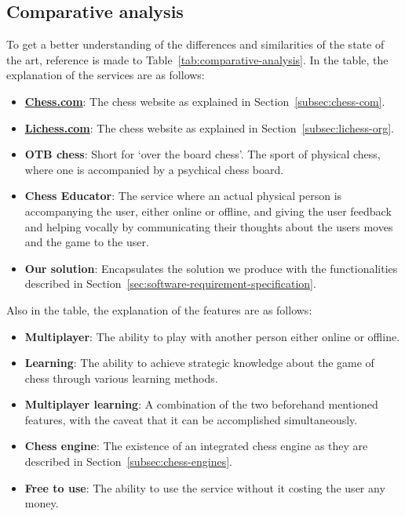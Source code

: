 \subsection{Comparative analysis}\label{subsec:comparative-analysis}

To get a better understanding of the differences and similarities of the state of the art, reference is made to
Table~\ref{tab:comparative-analysis}.
In the table, the explanation of the services are as follows:

\begin{itemize}
    \item \textbf{\url{Chess.com}}: The chess website as explained in Section~\ref{subsec:chess-com}.
    \item \textbf{\url{Lichess.com}}: The chess website as explained in Section~\ref{subsec:lichess-org}.
    \item \textbf{OTB chess}: Short for `over the board chess'.
    The sport of physical chess, where one is accompanied by a psychical chess board.
    \item \textbf{Chess Educator}: The service where an actual physical person is accompanying the user, either online
    or offline, and giving the user feedback and helping vocally by communicating their thoughts about the users moves
    and the game to the user.
    \item \textbf{Our solution}: Encapsulates the solution we produce with the functionalities described in
    Section~\ref{sec:software-requirement-specification}.
\end{itemize}

Also in the table, the explanation of the features are as follows:

\begin{itemize}
    \item \textbf{Multiplayer}: The ability to play with another person either online or offline.
    \item \textbf{Learning}: The ability to achieve strategic knowledge about the game of chess through various learning
    methods.
    \item \textbf{Multiplayer learning}: A combination of the two beforehand mentioned features, with the caveat that it
    can be accomplished simultaneously.
    \item \textbf{Chess engine}: The existence of an integrated chess engine as they are described in
    Section~\ref{subsec:chess-engines}.
    \item \textbf{Free to use}: The ability to use the service without it costing the user any money.
\end{itemize}

